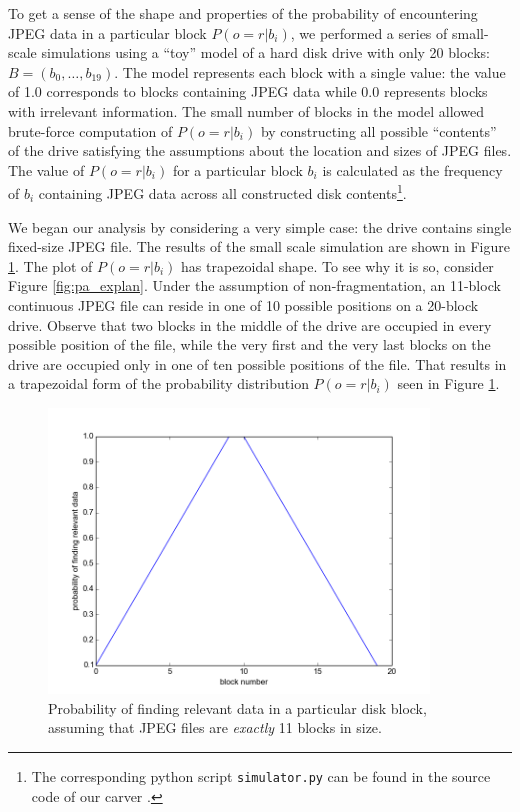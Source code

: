\documentclass[final,5p,times,twocolumn,authoryear]{elsarticle}
\begin{document}
To get a sense of the shape and properties of the probability of encountering JPEG data in a particular block $P(o=r | b_i)$, we performed a series of small-scale simulations using a ``toy'' model of a hard disk drive with only 20 blocks: $B=(b_0,\dots,b_{19})$. The model represents each block with a single value: the value of 1.0 corresponds to blocks containing JPEG data while 0.0 represents blocks with irrelevant information. The small number of blocks in the model allowed brute-force computation of $P(o=r | b_i)$ by constructing all possible ``contents'' of the drive satisfying the assumptions about the location and sizes of JPEG files. The value of  $P(o=r | b_i)$ for a particular block $b_i$ is calculated as the frequency of $b_i$ containing JPEG data across all constructed disk contents\footnote{The corresponding python script \texttt{simulator.py} can be found in the source code of our carver \citep{gladyshevjames2015}.}.

We began our analysis by considering a very simple case: the drive contains single fixed-size JPEG file. The results of the small scale simulation are shown in Figure \ref{fig:fig-20blk-11min-11max2d}. The plot of $P(o=r|b_i)$ has trapezoidal shape. To see why it is so, consider Figure \ref{fig:pa_explan}. Under the assumption of non-fragmentation, an 11-block continuous JPEG file can reside in one of 10 possible positions on a 20-block drive. Observe that two blocks in the middle of the drive are occupied in every possible position of the file, while the very first and the very last blocks on the drive are occupied only in one of ten possible positions of the file. That results in a trapezoidal form of the probability distribution $P(o=r|b_i)$ seen in Figure \ref{fig:fig-20blk-11min-11max2d}.

\begin{figure}
  \centerline{\includegraphics[width=0.9\textwidth]{fig-20blk-11min-11max2d}}
  \caption{Probability of finding relevant data in a particular disk block, assuming that JPEG files are \emph{exactly} 11 blocks in size.}
  \label{fig:fig-20blk-11min-11max2d}
\end{figure}
\end{document}
